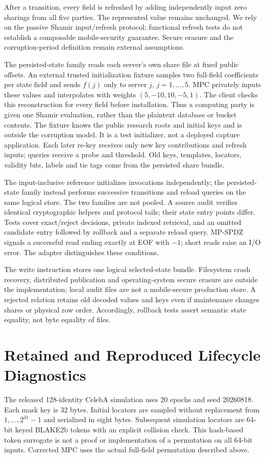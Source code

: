 \documentclass[journal,onecolumn]{IEEEtran}
\begin{document}
After a transition, every field is refreshed by adding independently input zero sharings from all five parties. The represented value remains unchanged. We rely on the passive Shamir input/refresh protocol; functional refresh tests do not establish a composable mobile-security guarantee. Secure erasure and the corruption-period definition remain external assumptions.

The persisted-state family reads each server's own share file at fixed public offsets. An external trusted initialization fixture samples two full-field coefficients per state field and sends $f(j)$ only to server $j$, $j=1,\ldots,5$. MPC privately inputs these values and interpolates with weights $(5,-10,10,-5,1)$. The client checks this reconstruction for every field before installation. Thus a computing party is given one Shamir evaluation, rather than the plaintext database or bucket contents. The fixture knows the public research roots and initial keys and is outside the corruption model. It is a test initializer, not a deployed capture application. Each later re-key receives only new key contributions and refresh inputs; queries receive a probe and threshold. Old keys, templates, locators, validity bits, labels and tie tags come from the persisted share bundle.

The input-inclusive reference initializes invocations independently; the persisted-state family instead performs successive transitions and reload queries on the same logical store. The two families are not pooled. A source audit verifies identical cryptographic helpers and protocol tails; their state entry points differ. Tests cover exact/reject decisions, private indexed retrieval, and an omitted candidate entry followed by rollback and a separate reload query. MP-SPDZ signals a successful read ending exactly at EOF with $-1$; short reads raise an I/O error. The adapter distinguishes these conditions.

The write instruction stores one logical selected-state bundle. Filesystem crash recovery, distributed publication and operating-system secure erasure are outside the implementation; local audit files are not a mobile-secure production store. A rejected relation retains old decoded values and keys even if maintenance changes shares or physical row order. Accordingly, rollback tests assert semantic state equality, not byte equality of files.

\section{Retained and Reproduced Lifecycle Diagnostics}\label{suppsec:supplement:4}
The released 128-identity CelebA simulation uses 20 epochs and seed 20260818. Each mask key is 32 bytes. Initial locators are sampled without replacement from $1,\ldots,2^{31}-1$ and serialized in eight bytes. Subsequent simulation locators are 64-bit keyed BLAKE2b tokens with an explicit collision check. This hash-based token surrogate is not a proof or implementation of a permutation on all 64-bit inputs. Corrected MPC uses the actual full-field permutation described above.
\end{document}
